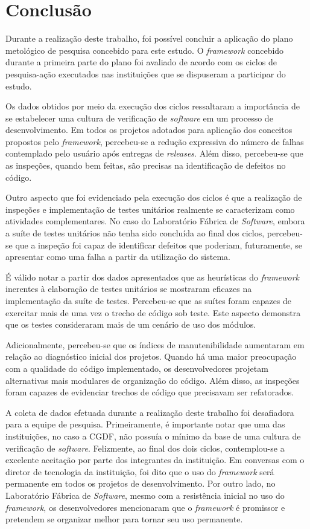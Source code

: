 \chapter{Conclusão}

Durante a realização deste trabalho, foi possível concluir a aplicação do plano metológico de pesquisa concebido para este estudo. O \textit{framework} concebido durante a primeira parte do plano foi avaliado de acordo com os ciclos de pesquisa-ação executados nas instituições que se dispuseram a participar do estudo.

Os dados obtidos por meio da execução dos ciclos ressaltaram a importância de se estabelecer uma cultura de verificação de \textit{software} em um processo de desenvolvimento. Em todos os projetos adotados para aplicação dos conceitos propostos pelo \textit{framework}, percebeu-se a redução expressiva do número de falhas contemplado pelo usuário após entregas de \textit{releases}. Além disso, percebeu-se que as inspeções, quando bem feitas, são precisas na identificação de defeitos no código.

Outro aspecto que foi evidenciado pela execução dos ciclos é que a realização de inspeções e implementação de testes unitários realmente se caracterizam como atividades complementares. No caso do Laboratório Fábrica de \textit{Software}, embora a suíte de testes unitários não tenha sido concluída ao final dos ciclos, percebeu-se que a inspeção foi capaz de identificar defeitos que poderiam, futuramente, se apresentar como uma falha a partir da utilização do sistema.

É válido notar a partir dos dados apresentados que as heurísticas do \textit{framework} inerentes à elaboração de testes unitários se mostraram eficazes na implementação da suíte de testes. Percebeu-se que as suítes foram capazes de exercitar mais de uma vez o trecho de código sob teste. Este aspecto demonstra que os testes consideraram mais de um cenário de uso dos módulos.

Adicionalmente, percebeu-se que os índices de manutenibilidade aumentaram em relação ao diagnóstico inicial dos projetos. Quando há uma maior preocupação com a qualidade do código implementado, os desenvolvedores projetam alternativas mais modulares de organização do código. Além disso, as inspeções foram capazes de evidenciar trechos de código que precisavam ser refatorados.

A coleta de dados efetuada durante a realização deste trabalho foi desafiadora para a equipe de pesquisa. Primeiramente, é importante notar que uma das instituições, no caso a CGDF, não possuía o mínimo da base de uma cultura de verificação de \textit{software}. Felizmente, ao final dos dois ciclos, contemplou-se a excelente aceitação por parte dos integrantes da instituição. Em conversas com o diretor de tecnologia da instituição, foi dito que o uso do \textit{framework} será permanente em todos os projetos de desenvolvimento. Por outro lado, no Laboratório Fábrica de \textit{Software}, mesmo com a resistência inicial no uso do \textit{framework}, os desenvolvedores mencionaram que o \textit{framework} é promissor e pretendem se organizar melhor para tornar seu uso permanente.

